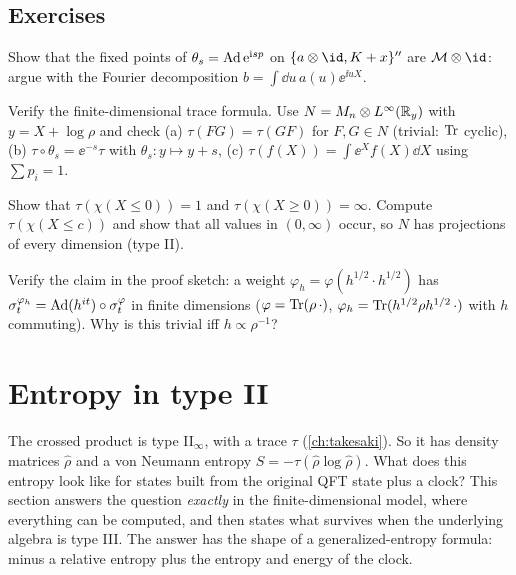\subsection*{Exercises}
\begin{exercise}\label{ex:takesaki:1}
Show that the fixed points of $\theta_s=\operatorname{Ad}\mathrm{e}^{\mathrm{i} sp}$ on $\{a\otimes\id,K+x\}''$ are $\M\otimes\id$: argue with the Fourier decomposition $b=\int\dd u\,a(u)\ee^{\ii uX}$.
\end{exercise}
\begin{exercise}\label{ex:takesaki:2}
Verify the finite-dimensional trace formula. Use $N=M_n\otimes L^\infty(\mathbb{R}_y)$ with $y=X+\log\rho$ and check (a) $\tau(FG)=\tau(GF)$ for $F,G\in N$ (trivial: $\operatorname{Tr}$ cyclic), (b) $\tau\circ\theta_s=\ee^{-s}\tau$ with $\theta_s:y\mapsto y+s$, (c) $\tau(f(X))=\int\ee^Xf(X)\dd X$ using $\sum p_i=1$.
\end{exercise}
\begin{exercise}\label{ex:takesaki:3}
Show that $\tau(\chi(X\le0))=1$ and $\tau(\chi(X\ge0))=\infty$. Compute $\tau(\chi(X\le c))$ and show that all values in $(0,\infty)$ occur, so $N$ has projections of every dimension (type II).
\end{exercise}
\begin{exercise}\label{ex:takesaki:4}
Verify the claim in the proof sketch: a weight $\varphi_h=\varphi(h^{1/2}\cdot h^{1/2})$ has $\sigma^{\varphi_h}_t=\operatorname{Ad}(h^{it})\circ\sigma^\varphi_t$ in finite dimensions ($\varphi=\operatorname{Tr}(\rho\,\cdot)$, $\varphi_h=\operatorname{Tr}(h^{1/2}\rho h^{1/2}\,\cdot)$ with $h$ commuting). Why is this trivial iff $h\propto\rho^{-1}$?
\end{exercise}

\section{Entropy in type II}\label{ch:entropy_II}

\begin{physmotiv}
The crossed product is type II$_\infty$, with a trace $\tau$ (\cref{ch:takesaki}). So it has density matrices $\hat\rho$ and a von Neumann entropy $S=-\tau(\hat\rho\log\hat\rho)$. What does this entropy look like for states built from the original QFT state plus a clock? This section answers the question \emph{exactly} in the finite-dimensional model, where everything can be computed, and then states what survives when the underlying algebra is type III. The answer has the shape of a generalized-entropy formula: minus a relative entropy plus the entropy and energy of the clock.
\end{physmotiv}

